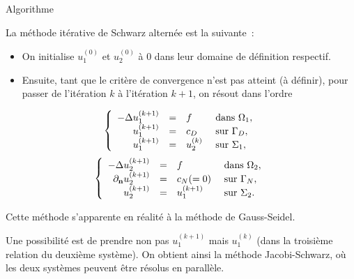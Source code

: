 \documentclass[
mode=present,    %
paper=a4paper,   %
orient=landscape,
display=slides,   %
size=10pt,
style=romain   %
]{powerdot}
\begin{document}
\begin{slide}[toc=Algorithme]{Algorithme}

La méthode itérative de Schwarz alternée est la suivante~:
\begin{itemize}
\item  On initialise $u_{1}^{(0)}$ et $u_{2}^{(0)}$ à $0$ dans leur domaine de
  définition respectif.
\item Ensuite, tant que le critère de convergence n'est pas atteint (à définir),
  pour passer de l'itération $k$ à l'itération $k+1$, on résout dans
  l'ordre
\end{itemize}
$$
\left\{\begin{array}{r c l l}
-\Delta u_{1}^{(k+1)} &=& f &\text{ dans } \Omega_{1},\\
u_{1}^{(k+1)} &=& c_{D} & \text{ sur }\Gamma_{D},\\
u_{1}^{(k+1)} &=& u_{2}^{(k)} & \text{ sur }\Sigma_{1},\\
\end{array}\right.
$$
$$
\left\{\begin{array}{r c l l}
-\Delta u_{2}^{(k+1)} &=& f &\text{ dans } \Omega_{2},\\
\partial_{\mathbf{n}} u_{2}^{(k+1)} &=& c_{N} (=0)& \text{ sur }\Gamma_{N},\\
u_{2}^{(k+1)} &=& u_{1}^{(k+1)} & \text{ sur }\Sigma_{2}.\\
\end{array}\right.
$$

\bigskip
Cette méthode s'apparente en réalité à la méthode de Gauss-Seidel. 

\smallskip
Une possibilité est de prendre non pas $u_{1}^{(k+1)}$ mais $u_{1}^{(k)}$ (dans
la troisième relation du deuxième système). On obtient ainsi la méthode
Jacobi-Schwarz, où les deux systèmes peuvent être résolus en parallèle.

\end{slide}
\end{document}
